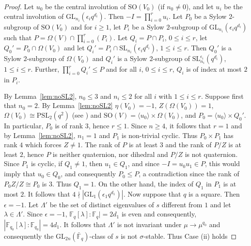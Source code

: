 \documentclass{amsart}
\theoremstyle{plain}\newtheorem{Theorem}{Theorem}[section]
\theoremstyle{plain}\newtheorem{Conjecture}[Theorem]{Conjecture}
\theoremstyle{plain}\newtheorem{Corollary}[Theorem]{Corollary}
\theoremstyle{plain}\newtheorem{Lemma}[Theorem]{Lemma}
\theoremstyle{plain}\newtheorem{Proposition}[Theorem]{Proposition}
\theoremstyle{definition}\newtheorem{Definition}[Theorem]{Definition}
\theoremstyle{definition}\newtheorem{Example}[Theorem]{Example}
\theoremstyle{definition}\newtheorem{Examples}[Theorem]{Examples}
\theoremstyle{definition}\newtheorem{Exercise}[Theorem]{Exercise}
\theoremstyle{definition}\newtheorem{Notation}[Theorem]{Notation}
\theoremstyle{definition}\newtheorem{Remark}[Theorem]{Remark}
\theoremstyle{definition}\newtheorem{Remarks}[Theorem]{Remarks}
\def\GL{\mathrm{GL}}
\def\PSL{\mathrm{PSL}}
\def\SL{\mathrm{SL}}
\def\SO{\mathrm{SO}}
\numberwithin{equation}{section}
\begin{document}
\begin{proof}   Let $u_0 $ be the central involution of $\SO(V_0) $  (if   $n_0 \ne 0$), and let $u_i$ be the central involution of $\GL_{n_i}(\epsilon_iq^{d_i} ) $. Then $-I =\prod_{i=0}^r u_i $.  Let   $P_0 $ be  a  Sylow $2$-subgroup   of $\SO(V_0) $   and  for  $i \geq 1 $, let    $P_i $  be  a Sylow $2$-subgroup of $\GL_{n_i}(\epsilon_iq^{d_i} ) $ such that $ P =  \Omega(V) \cap   \prod_{i=0}^r (P_i) $. Let  
$Q_i  = P \cap P_i$, $0  \leq i \leq r $,  let $Q_0' = P_0 \cap \Omega (V_0) $ and let $Q_i'=  P_i \cap  \SL_{n_i}(\epsilon_iq^{d_i} ) $, $ 1\leq i \leq r $.  Then $Q_0'$ is  a Sylow   $2$-subgroup of  $ \Omega (V_0) $ and  $Q_i'$ is  a  Sylow $2$-subgroup of    $\SL_{n_i}^{\epsilon_i} (q^{d_i} ) $,  $1\leq i \leq r $. Further,     $\prod_{i=0}^r Q_i'  \leq   P$  and for all $i$, $0\leq i \leq  r$, $Q_i $ is of index  at most  $2$ in $P_i$.


By  Lemma~\ref{lem:noSL2},  $n_0\leq  3  $ and  $n_i \leq 2 $ for all $i $ with $1\leq i \leq r $.  Suppose  first that  $n_0  =2 $. By Lemma~\ref{lem:noSL2}  $\eta(V_0) =-1$,  $Z(\Omega(V_0))=1 $,  $\Omega(V_0) \cong  \PSL_2(q^2)$  (see \cite[Prop.~2.9.1]{KlLi}) and  $\SO(V) = \langle u_0\rangle \times \Omega (V_0)$, and $P_0 =    \langle u_0\rangle \times  Q_0' $.   In particular,   $P_0$    is of rank  $3$, hence  $r \leq 1 $. Since  $n \geq 4 $,  it follows that  $r=1 $  and  by   Lemma~\ref{lem:noSL2}, $n_1 = 1 $ and  $P_1 $ is  non-trivial  cyclic.  Thus  $P_0 \times P_1 $ has  rank $4$  which forces $Z \ne 1 $.  The  rank of $P$ is at least $3$ and the rank of $P/Z$ is at  least  $2$, hence $P$ is  neither  quaternion, nor dihedral and $P/Z$ is not quaternion.   Since $P_1 $ is cyclic, if  $Q_1 \ne 1 $, then $u_1 \in  Q_1 $,  and since $-I =u_0u_1 \in P$, this would imply  that $u_0 \in   Q_0 $, and consequently $P_0 \leq  P$, a contradiction since   the rank of $P_0Z/Z  \cong P_0 $ is  $3$.  Thus $Q_1 =  1 $.  On the other hand, the index of $Q_1 $ in $P_1$ is at most $2$. It follows that     $4\nmid  |\GL_1 (\epsilon_1q^{d_1})| $.    Now suppose that $q$ is a  square.  Then  $\epsilon=-1 $.   Let $\Lambda'$ be  the set of distinct eigenvalues of $s$  different from $1$  and let $\lambda \in \Lambda'$.   Since $\epsilon=-1 $, ${\mathbb F}_q [\lambda ]: {\mathbb F}_q|=2d_1$ is even  and  consequently, $|{\mathbb F}_{q_0} [\lambda ]: {\mathbb F}_{q_0}|=4d_1$. It follows that  $\Lambda' $ is  not invariant  under  $\mu \to  \mu^{q_0} $ and consequently   the $\GL_{2n} (\bar{\mathbb F}_q)$-class of $s$ is not $\sigma$-stable.  Thus Case (ii) holds



\end{proof}
\end{document}

